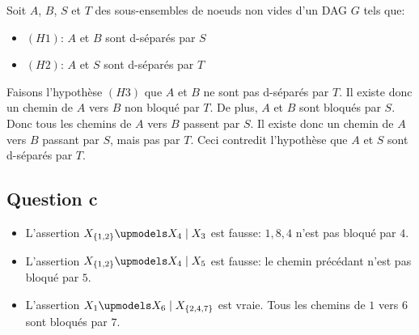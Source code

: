 \documentclass{article}
\begin{document}
Soit $A$, $B$, $S$ et $T$ des sous-ensembles de noeuds non vides d'un DAG $G$
tels que:

\begin{itemize}
\item $(H1)$: $A$ et $B$ sont d-séparés par $S$
\item $(H2)$: $A$ et $S$ sont d-séparés par $T$
\end{itemize}

Faisons l'hypothèse $(H3)$ que $A$ et $B$ ne sont pas d-séparés par $T$. Il
existe donc un chemin de $A$ vers $B$ non bloqué par $T$. De plus, $A$ et $B$
sont bloqués par $S$. Donc tous les chemins de $A$ vers $B$ passent par $S$. Il
existe donc un chemin de $A$ vers $B$ passant par $S$, mais pas par $T$. Ceci
contredit l'hypothèse que $A$ et $S$ sont d-séparés par $T$.

\subsection{Question c}

\begin{itemize}
\item L'assertion $X_{\{1, 2\}} \upmodels X_4 \mid X_3$ est fausse: ${1, 8, 4}$ n'est pas
bloqué par $4$.
\item L'assertion $X_{\{1, 2\}} \upmodels X_4 \mid X_5$ est fausse: le chemin précédant
n'est pas bloqué par $5$.
\item L'assertion $X_1 \upmodels X_6 \mid X_{\{2, 4, 7\}}$ est vraie. Tous les chemins
de $1$ vers $6$ sont bloqués par $7$.
\end{itemize}
\end{document}

